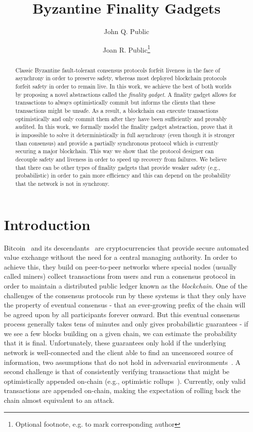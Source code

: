 \documentclass[a4paper,UKenglish,cleveref, autoref, thm-restate, anonymous]{lipics-v2019}
\title{Byzantine Finality Gadgets}
\author{John Q. Public}{Dummy University Computing Laboratory, [optional: Address], Country \and My second affiliation, Country \and \url{http://www.myhomepage.edu} }{johnqpublic@dummyuni.org}{https://orcid.org/0000-0002-1825-0097}{(Optional) author-specific funding acknowledgements}%
\author{Joan R. Public\footnote{Optional footnote, e.g. to mark corresponding author}}{Department of Informatics, Dummy College, [optional: Address], Country}{joanrpublic@dummycollege.org}{[orcid]}{[funding]}
\begin{document}
\maketitle

\begin{abstract}
Classic Byzantine fault-tolerant consensus protocols forfeit liveness in the face of asynchrony in order to preserve safety, whereas most deployed blockchain protocols forfeit safety in order to remain live. 
In this work, we achieve the best of both worlds by proposing a novel abstractions called the \emph{finality gadget}.
A finality gadget allows for transactions to always optimistically commit but informs the clients that these transactions might be unsafe. As a result, a blockchain can execute transactions optimistically and only commit them after they have been sufficiently and provably audited.
In this work, we formally model the finality gadget abstraction, prove that it is impossible to solve it deterministically in full asynchrony (even though it is stronger than consensus) and provide a partially synchronous protocol which is currently securing a major blockchain. This way we show that the protocol designer can decouple safety and liveness in order to speed up recovery from failures. We believe that there can be other types of finality gadgets that provide weaker safety (e.g., probabilistic) in order to gain more efficiency and this can depend on the probability that the network is not in synchrony.
\end{abstract}
\section{Introduction}


Bitcoin~\cite{nakamoto08bitcoin} and its descendants~\cite{wood14ethereum,sasson2014zerocash} are cryptocurrencies that provide 
secure automated value exchange without the need for a central managing authority. 
In order to achieve this, they build on peer-to-peer networks where special nodes (usually called miners) 
collect transactions from users and run a consensus protocol in order to maintain a distributed public ledger
known as the \textit{blockchain}.
One of the challenges of the consensus protocols run by these systems is that they only have the property of eventual consensus - that an ever-growing prefix of the chain will be agreed upon by all participants forever onward. But this eventual consensus process generally takes tens of minutes and only gives probabilistic guarantees - if we see a few blocks building on a given chain, we can estimate the probability that it is final.
Unfortunately, these guarantees only hold if the underlying network is well-connected and the client able to find an uncensored source of information, two assumptions that
do not hold in adversarial environments~\cite{apostolaki16hijacking, gervais15tampering, heilman15eclipse,pass16analysis}.
A second challenge is that of consistently verifying transactions that might be optimistically appended on-chain (e.g., optimistic rollups~\cite{al19lazyledger}). Currently, only valid transactions are appended on-chain, making the expectation of rolling back the chain almost equivalent to an attack.
\end{document}
